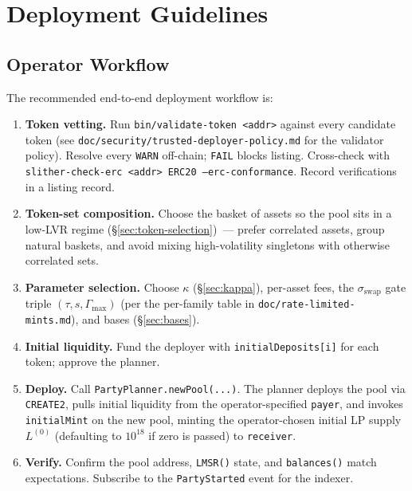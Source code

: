 \documentclass[11pt]{article}
\begin{document}
\section{Deployment Guidelines}
\label{sec:deploy}

\subsection{Operator Workflow}

The recommended end-to-end deployment workflow is:

\begin{enumerate}
  \item \textbf{Token vetting.} Run \texttt{bin/validate-token <addr>}
        against every candidate token (see
        \texttt{doc/\allowbreak security/\allowbreak trusted-deployer-policy.md}
        for the validator policy). Resolve every \texttt{WARN} off-chain;
        \texttt{FAIL} blocks listing. Cross-check with
        \texttt{slither-check-erc <addr> ERC20 --erc-conformance}. Record
        verifications in a listing record.
  \item \textbf{Token-set composition.} Choose the basket of assets so the
        pool sits in a low-LVR regime
        (\S\ref{sec:token-selection})~--- prefer correlated assets, group
        natural baskets, and avoid mixing high-volatility singletons with
        otherwise correlated sets.
  \item \textbf{Parameter selection.} Choose $\kappa$ (\S\ref{sec:kappa}),
        per-asset fees, the $\sigma_{\mathrm{swap}}$ gate triple
        $(\tau, s, \Gamma_{\max})$ (per the per-family table in
        \texttt{doc/rate-limited-mints.md}), and bases
        (\S\ref{sec:bases}).
  \item \textbf{Initial liquidity.} Fund the deployer with
        \texttt{initialDeposits[i]} for each token; approve the planner.
  \item \textbf{Deploy.} Call \texttt{PartyPlanner.newPool(...)}. The
        planner deploys the pool via \texttt{CREATE2}, pulls initial
        liquidity from the operator-specified \texttt{payer}, and invokes
        \texttt{initialMint} on the new pool, minting the operator-chosen
        initial LP supply $L^{(0)}$ (defaulting to $10^{18}$ if zero is
        passed) to \texttt{receiver}.
  \item \textbf{Verify.} Confirm the pool address, \texttt{LMSR()} state, and
        \texttt{balances()} match expectations. Subscribe to the
        \texttt{PartyStarted} event for the indexer.
\end{enumerate}
\end{document}
